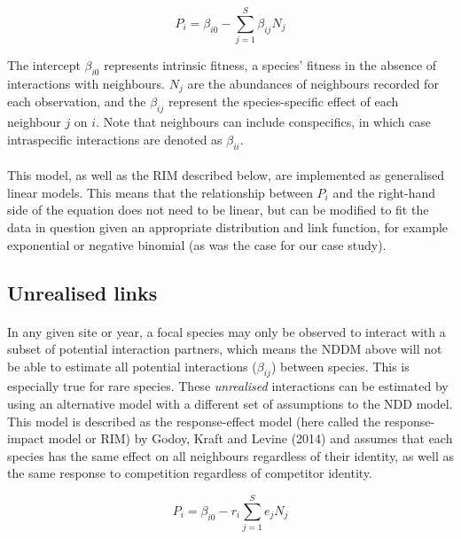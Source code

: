 \documentclass[a4,12pt]{article}
\begin{document}
        \begin{equation}
        P_{i} = \beta_{i0} - \sum_{j=1}^{S} \beta_{ij} N_{j}
        \label{nddm}
        \end{equation}
        
        The intercept $\beta_{i0}$ represents intrinsic fitness, a species' fitness in the absence of interactions with neighbours. $N_{j}$ are the abundances of neighbours recorded for each observation, and the $\beta_{ij}$ represent the species-specific effect of each neighbour $j$ on $i$. Note that neighbours can include conspecifics, in which case intraspecific interactions are denoted as $\beta_{ii}$.

        \paragraph{}
        This model, as well as the RIM described below, are implemented as generalised linear models. This means that the relationship between $P_i$ and the right-hand side of the equation does not need to be linear, but can be modified to fit the data in question given an appropriate distribution and link function, for example exponential or negative binomial (as was the case for our case study). 
              
    \subsection{Unrealised links}
    
        \paragraph{}
        In any given site or year, a focal species may only be observed to interact with a subset of potential interaction partners, which means the NDDM above will not be able to estimate all potential interactions ($\beta_{ij}$) between species. This is especially true for rare species. These \textit{unrealised} interactions can be estimated by using an alternative model with a different set of assumptions to the NDD model. This model is described as the response-effect model (here called the response-impact model or RIM) by Godoy, Kraft and Levine (2014) and assumes that each species has the same effect on all neighbours regardless of their identity, as well as the same response to competition regardless of competitor identity. 
        
        \begin{equation}
        P_{i} = \beta_{i0} - r_{i} \sum_{j=1}^{S} e_{j} N_{j}
        \label{rim}
        \end{equation}
        
\end{document}
